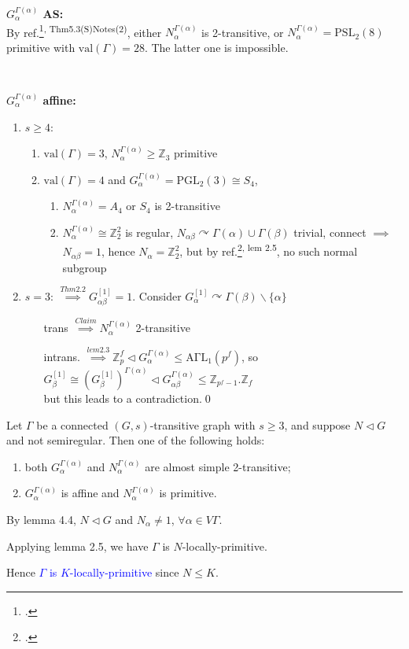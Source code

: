 \documentclass{beamer}
\def\PSL{\mathrm{PSL}}
\def\PGL{\mathrm{PGL}}
\def\AGaL{\mathrm{A\Gamma L}}
\def\val{\mathrm{val}}
\def\LemFive{\begin{lemma}[2.5]
Let $\Gamma$ be a connected $(G,s)$-transitive graph with $s\geq 3$, and suppose $N\triangleleft G$ and not semiregular. Then one of the following holds:
\begin{enumerate}
	\item both $G_\alpha^{\Gamma(\alpha)}$ and $N_\alpha^{\Gamma(\alpha)}$ are almost simple 2-transitive;
	\item $G_\alpha^{\Gamma(\alpha)}$ is affine and $N_\alpha^{\Gamma(\alpha)}$ is primitive.
\end{enumerate}
\end{lemma}}
\begin{document}
\begin{frame}
\textbf{$G_\alpha^{\Gamma(\alpha)}$ AS:}\\
By ref.\footcite{Cameron1981}\textsuperscript{, Thm5.3(S)Notes(2)}, either $N_\alpha^{\Gamma(\alpha)}$ is 2-transitive, or $N_\alpha^{\Gamma(\alpha)}=\PSL_2(8)$ primitive with $\val(\Gamma)=28$. The latter one is impossible.

\ 

\textbf{$G_\alpha^{\Gamma(\alpha)}$ affine:}
\begin{enumerate}
	\item $s\geq 4$:
		\begin{enumerate}
			\item $\val(\Gamma)=3$, $N_\alpha^{\Gamma(\alpha)}\geq \mathbb{Z}_3$ primitive 
			\item $\val(\Gamma)=4$ and $G_\alpha^{\Gamma(\alpha)}=\PGL_2(3)\cong S_4$, 
				\begin{enumerate}
					\item $N_\alpha^{\Gamma(\alpha)}=A_4$ or $S_4$ is 2-transitive
					\item $N_\alpha^{\Gamma(\alpha)}\cong\mathbb{Z}_2^2$ is regular, $N_{\alpha\beta}\curvearrowright \Gamma(\alpha)\cup\Gamma(\beta)$ trivial, connect $\implies$ $N_{\alpha\beta}=1$, hence $N_\alpha=\mathbb{Z}_2^2$, but by ref.\footcite{LI2006164}\textsuperscript{, lem 2.5}, no such normal subgroup
				\end{enumerate}
		\end{enumerate}
	\item $s=3$: $\mathop{\implies}\limits^{Thm 2.2} G_{\alpha\beta}^{[1]}=1$. Consider $G_\alpha^{[1]}\curvearrowright\Gamma(\beta)\backslash\{\alpha\}$
		\begin{itemize}
			\item[trans] $\mathop{\implies}\limits^{Claim} N_\alpha^{\Gamma(\alpha)}$ 2-transitive
			\item[intrans.] $\mathop{\implies}\limits^{lem 2.3}\mathbb{Z}_p^f\triangleleft G_\alpha^{\Gamma(\alpha)}\leq\AGaL_1(p^f)$, so $G_\beta^{[1]}\cong(G_\beta^{[1]})^{\Gamma(\alpha)}\triangleleft G_{\alpha\beta}^{\Gamma(\alpha)}\leq \mathbb{Z}_{p^f-1}.\mathbb{Z}_f$\\but this leads to a contradiction.\qed
		\end{itemize}
\end{enumerate}
\end{frame}

\begin{frame}
\LemFive
By lemma 4.4, $N\triangleleft G$ and $N_\alpha\neq 1$, $\forall \alpha\in V\Gamma$. 

Applying lemma 2.5, we have $\Gamma$ is $N$-locally-primitive.

Hence \textcolor{blue}{$\Gamma$ is $K$-locally-primitive} since $N\leq K$.

\end{frame}
\end{document}
